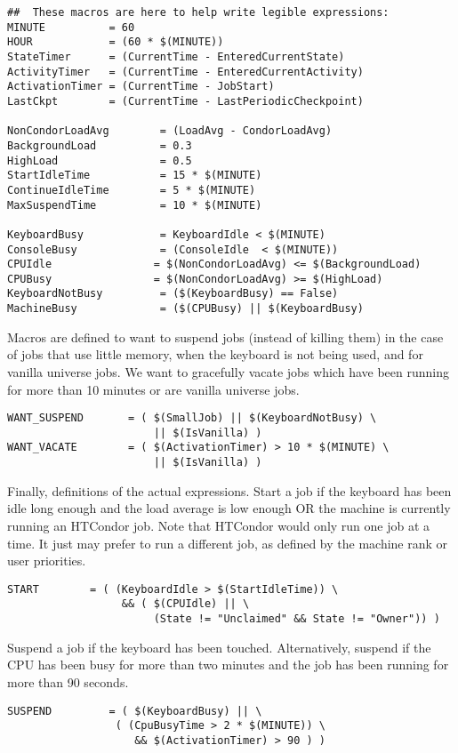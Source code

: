 \begin{verbatim}
##  These macros are here to help write legible expressions:
MINUTE          = 60
HOUR            = (60 * $(MINUTE))
StateTimer      = (CurrentTime - EnteredCurrentState)
ActivityTimer   = (CurrentTime - EnteredCurrentActivity)
ActivationTimer = (CurrentTime - JobStart)
LastCkpt        = (CurrentTime - LastPeriodicCheckpoint)

NonCondorLoadAvg        = (LoadAvg - CondorLoadAvg)
BackgroundLoad          = 0.3
HighLoad                = 0.5
StartIdleTime           = 15 * $(MINUTE)
ContinueIdleTime        = 5 * $(MINUTE)
MaxSuspendTime          = 10 * $(MINUTE)

KeyboardBusy            = KeyboardIdle < $(MINUTE)
ConsoleBusy             = (ConsoleIdle  < $(MINUTE))
CPUIdle                = $(NonCondorLoadAvg) <= $(BackgroundLoad)
CPUBusy                = $(NonCondorLoadAvg) >= $(HighLoad)
KeyboardNotBusy         = ($(KeyboardBusy) == False)
MachineBusy             = ($(CPUBusy) || $(KeyboardBusy)
\end{verbatim}

Macros are defined to want to suspend jobs (instead of
killing them) in the case of jobs that use little memory,
when the keyboard is not being used, and for vanilla universe
jobs.
We want to gracefully vacate jobs which
have been running for more than 10 minutes
or are vanilla universe jobs.
\begin{verbatim}
WANT_SUSPEND       = ( $(SmallJob) || $(KeyboardNotBusy) \
                       || $(IsVanilla) )
WANT_VACATE        = ( $(ActivationTimer) > 10 * $(MINUTE) \
                       || $(IsVanilla) )
\end{verbatim}

Finally, definitions of the actual expressions.
Start a job if 
the keyboard has been idle long enough and
the load average is low enough OR the machine is currently
running an HTCondor job.
Note that HTCondor would only run one job at a time.
It just may prefer to run a different job, as defined by
the machine rank or user priorities.
\begin{verbatim}
START        = ( (KeyboardIdle > $(StartIdleTime)) \
                  && ( $(CPUIdle) || \
                       (State != "Unclaimed" && State != "Owner")) )
\end{verbatim}

Suspend a job if the keyboard has been touched.
Alternatively, suspend if the CPU has been busy for more than two minutes
and the job has been running for more than 90 seconds.
\begin{verbatim}
SUSPEND         = ( $(KeyboardBusy) || \
                 ( (CpuBusyTime > 2 * $(MINUTE)) \
                    && $(ActivationTimer) > 90 ) )
\end{verbatim}

